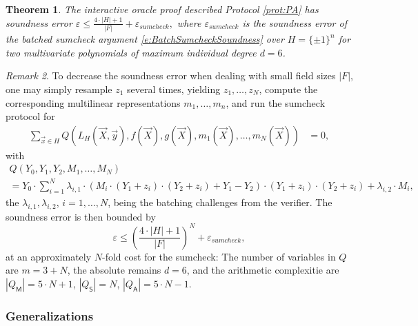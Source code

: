 \documentclass[11pt]{article}
\newtheorem{thm}{Theorem}[]
\theoremstyle{definition}
\theoremstyle{remark}
\newtheorem{rem}[thm]{Remark}
\begin{document}
\begin{thm}
\label{thm:PAsoundness}
 The interactive oracle proof described Protocol \ref{prot:PA} has soundness error
$
\varepsilon \leq \frac{4\cdot |H| + 1}{|F|} + \varepsilon_{sumcheck},
$
where $\varepsilon_{sumcheck}$ is the soundness error of the batched sumcheck argument \eqref{e:BatchSumcheckSoundness} over $H=\{\pm 1\}^n$ for two multivariate polynomials of maximum individual degree $d=6$.
\end{thm}
\begin{rem}
To decrease the soundness error when dealing with small field sizes $|F|$, one may simply resample $z_1$ several times, yielding $z_{1}, \ldots, z_N$, compute the corresponding multilinear representations $m_1, \ldots, m_n$,  and run the sumcheck protocol for
\begin{align} 
\label{e:sumcheckm}
	\sum_{\vec x \in H} Q(L_H(\vec X, \vec y), f(\vec X),  g(\vec X), m_1(\vec X),  \ldots,  m_N(\vec X))&= 0,
\end{align}
with
\begin{multline*}
Q(Y_0 , Y_1, Y_{2}, M_1, \ldots, M_N) 
\\=   
Y_0 \cdot\sum_{i=1}^N \lambda_{i,1}\cdot   \left(M_i\cdot (Y_1 + z_i)\cdot (Y_2+z_i) + Y_1 -  Y_2 \right)\cdot  (Y_1+z_i) \cdot (Y_2 + z_i) +  \lambda_{i,2} \cdot M_i,
\end{multline*}
the $\lambda_{i,1}, \lambda_{i,2}$, $i=1,\ldots, N$, being the batching challenges from the verifier.
The soundness error is then bounded by 
\[
\varepsilon \leq \left(\frac{4\cdot |H| + 1}{|F|}\right)^N + \varepsilon_{sumcheck},
\]
at an approximately  $N$-fold cost for the sumcheck:
The number of variables in $Q$ are  $m= 3 + N$, the absolute remains $d=6$, and the arithmetic complexitie are 
$|Q_\mathsf M|= 5\cdot N + 1$, $|Q_\mathsf S| = N$,  $|Q_\mathsf A|= 5 \cdot N - 1$.
\end{rem}

\subsubsection{Generalizations}
\label{s:PAGeneralizations}
\end{document}
